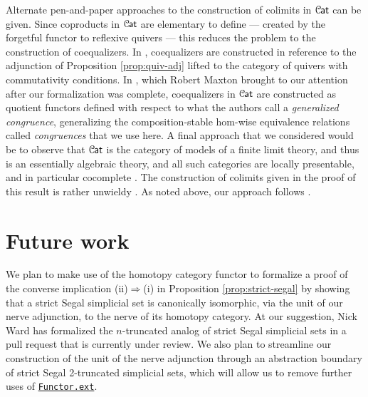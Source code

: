 \documentclass[a4paper,UKenglish,cleveref, autoref, thm-restate]{lipics-v2021}
\newcommand{\cat}[1]{\textup{\textsf{#1}}}%
\newcommand{\1}{\mathbbe{1}}
\newcommand{\2}{\mathbbe{2}}
\newcommand{\3}{\mathbbe{3}}
\newcommand{\Cat}{\mathcal{C}{\kern-.75pt}\cat{at}}
\newcommand{\cdoc}[2][]{\href{https://leanprover-community.github.io/mathlib4_docs/find/?pattern=CategoryTheory.#1#2\#doc}{\texttt{#2}}}
\begin{document}
Alternate pen-and-paper approaches to the construction of colimits in $\Cat$ can be given. Since coproducts in $\Cat$ are elementary to define --- created by the forgetful functor to reflexive quivers --- this reduces the problem to the construction of coequalizers. In \cite[5.1.7]{Borceux:1994hbI}, coequalizers are constructed in reference to the adjunction of Proposition \ref{prop:quiv-adj} lifted to the category of quivers with commutativity conditions.  In \cite{BBP:Generalized}, which Robert Maxton brought to our attention after our formalization was complete, coequalizers in $\Cat$ are constructed as quotient functors defined with respect to what the authors call a \emph{generalized congruence}, generalizing the composition-stable hom-wise equivalence relations called \emph{congruences} that we use here. A final approach that we considered would be to observe that $\Cat$ is the category of models of a finite limit theory, and thus is an essentially algebraic theory, and all such categories are locally presentable, and in particular cocomplete \cite[\S 3.D]{AdamekRosicky}. The construction of colimits given in the proof of this result is rather unwieldy \cite[3.36]{AdamekRosicky}. As noted above, our approach follows \cite[4.5.16]{Riehl:2016cc}.

\section{Future work}\label{sec:future}

We plan to make use of the homotopy category functor to formalize a proof of the converse implication (ii)$\Rightarrow$(i) in Proposition \ref{prop:strict-segal} by showing that a strict Segal simplicial set is canonically isomorphic, via the unit of our nerve adjunction, to the nerve of its homotopy category. At our suggestion, Nick Ward has formalized the $n$-truncated analog of strict Segal simplicial sets in a pull request that is currently under review. We also plan to streamline our construction of the unit of the nerve adjunction through an abstraction boundary of strict Segal 2-truncated simplicial sets, which will allow us to remove further uses of \cdoc{Functor.ext}.
\end{document}
